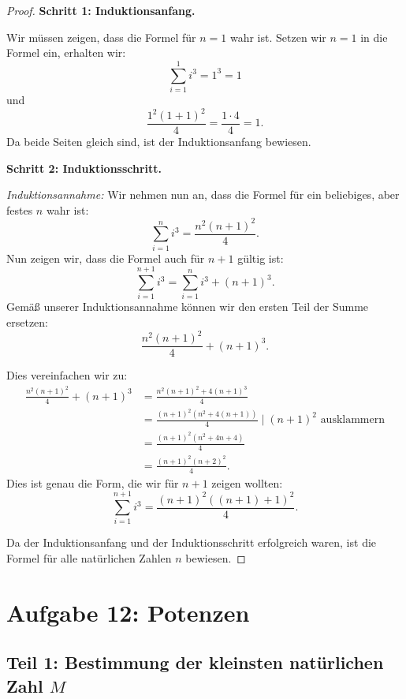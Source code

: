 \documentclass[12pt]{article}
\begin{document}
\begin{proof}

	\textbf{Schritt 1: Induktionsanfang.}

	Wir müssen zeigen, dass die Formel für \( n = 1 \) wahr ist. Setzen wir \( n = 1 \) in die Formel ein, erhalten wir:
	\[
		\sum_{i=1}^{1} i^3 = 1^3 = 1
	\]
	und
	\[
		\frac{1^2(1 + 1)^2}{4} = \frac{1 \cdot 4}{4} = 1.
	\]
	Da beide Seiten gleich sind, ist der Induktionsanfang bewiesen.
	
	\textbf{Schritt 2: Induktionsschritt.}

	\textit{Induktionsannahme:} Wir nehmen nun an, dass die Formel für ein beliebiges, aber festes \( n \) wahr ist:
	\[
		\sum_{i=1}^{n} i^3 = \frac{n^2(n + 1)^2}{4}.
	\]
	Nun zeigen wir, dass die Formel auch für \( n + 1 \) gültig ist:
	\[
		\sum_{i=1}^{n+1} i^3 = \sum_{i=1}^{n} i^3 + (n + 1)^3.
	\]
	Gemäß unserer Induktionsannahme können wir den ersten Teil der Summe ersetzen:
	\[
		\frac{n^2(n + 1)^2}{4} + (n + 1)^3.
	\]

	Dies vereinfachen wir zu:
	\begin{align*}
		\frac{n^2(n + 1)^2}{4} + (n + 1)^3 & = \frac{n^2(n + 1)^2 + 4(n + 1)^3}{4}                                    \\
		                                   & = \frac{(n + 1)^2(n^2 + 4(n + 1))}{4} \mid (n + 1)^2 \text{ ausklammern} \\
		                                   & = \frac{(n + 1)^2(n^2 + 4n + 4)}{4}                                      \\
		                                   & = \frac{(n + 1)^2(n + 2)^2}{4}.
	\end{align*}		Dies ist genau die Form, die wir für \( n + 1 \) zeigen wollten:
	\[
		\sum_{i=1}^{n+1} i^3 = \frac{(n+1)^2((n+1) + 1)^2}{4}.
	\]
	
	Da der Induktionsanfang und der Induktionsschritt erfolgreich waren, ist die Formel für alle natürlichen Zahlen \( n \) bewiesen.
\end{proof}

\section*{Aufgabe 12: Potenzen}

\subsection*{Teil 1: Bestimmung der kleinsten natürlichen Zahl \( M \)}
\end{document}

